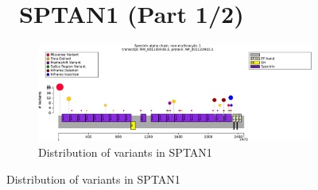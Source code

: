 \begin{figure}[htbp]
\section*{ SPTAN1 (Part 1/2)}
\centering
\begin{subfigure}[b]{0.95\textwidth}
\centering
\includegraphics[width=\textwidth]{ img/SPTAN1_protein_diagram.pdf} 
\captionsetup{justification=raggedright,singlelinecheck=false}
\caption{Distribution of variants in SPTAN1}
\end{subfigure}

\vspace{2em}


\end{figure}
